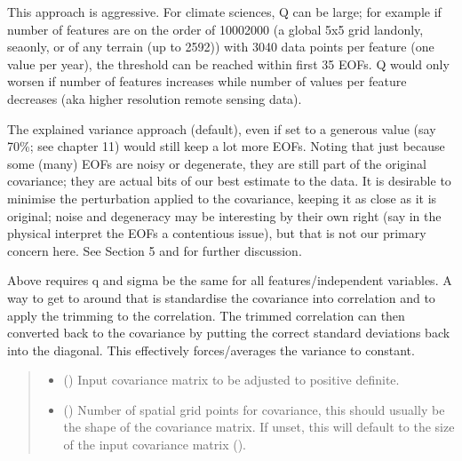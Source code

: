 \documentclass[letterpaper,10pt,english]{sphinxmanual}
\begin{document}
\begin{fulllineitems}
\sphinxAtStartPar
This approach is aggressive. For climate sciences, Q can be
large; for example if number of features are on the order of 1000\sphinxhyphen{}2000 (a
global 5x5 grid land\sphinxhyphen{}only, sea\sphinxhyphen{}only, or of any terrain (up to 2592)) with
30\sphinxhyphen{}40 data points per feature (one value per year), the threshold can be
reached within first 3\sphinxhyphen{}5 EOFs. Q would only worsen if number of features
increases while number of values per feature decreases (aka higher
resolution remote sensing data).

\sphinxAtStartPar
The explained variance approach (default), even if set to a generous
value (say 70\%; see  chapter 11) would still keep a lot more EOFs.
Noting that just because some (many) EOFs are noisy or degenerate, they are
still part of the original covariance; they are actual bits of our best
estimate to the data. It is desirable to minimise the perturbation applied
to the covariance, keeping it as close as it is original; noise and
degeneracy may be interesting by their own right (say in the physical
interpret the EOFs \textendash{} a contentious issue), but that is not our
primary concern here. See  Section 5 and 
for further discussion.

\sphinxAtStartPar
Above requires q and sigma be the same for all features/independent
variables. A way to get to around that is standardise the covariance into
correlation and to apply the trimming to the correlation. The trimmed
correlation can then converted back to the covariance by putting the
correct standard deviations back into the diagonal. This effectively
forces/averages the variance to constant.
\begin{quote}\begin{description}
\begin{itemize}
\item {}
\sphinxAtStartPar
{} () \textendash{} Input covariance matrix to be adjusted to positive definite.

\item {}
\sphinxAtStartPar
{} () \textendash{} Number of spatial grid points for covariance, this should usually be the
shape of the covariance matrix. If unset, this will default to the size
of the input covariance matrix ().


\end{itemize}
\end{description}
\end{quote}
\end{fulllineitems}
\end{document}
